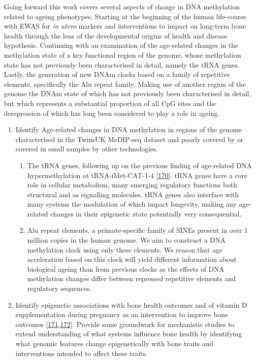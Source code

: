 \documentclass[
]{book}
\providecommand{\tightlist}{%
  \setlength{\itemsep}{0pt}\setlength{\parskip}{0pt}}
\begin{document}
Going forward this work covers several aspects of change in DNA methylation related to ageing phenotypes.
Starting at the beginning of the human life-course with EWAS for \emph{in utero} markers and interventions to impact on long-term bone health through the lens of the developmental origins of health and disease hypothesis.
Continuing with an examination of the age-related changes in the methylation state of a key functional region of the genome, whose methylation state has not previously been characterised in detail, namely the tRNA genes.
Lastly, the generation of new DNAm clocks based on a family of repetitive elements, specifically the Alu repeat family. Making use of another region of the genome the DNAm state of which has not previously been characterised in detail, but which represents a substantial proportion of all CpG sites and the derepression of which has long been considered to play a role in ageing.

\begin{enumerate}
\def\labelenumi{\arabic{enumi}.}
\item
  Identify Age-related changes in DNA methylation in regions of the genome characterised in the TwinsUK MeDIP-seq dataset and poorly covered by or covered in small samples by other technologies.

  \begin{enumerate}
  \def\labelenumii{\alph{enumii}.}
  \tightlist
  \item
    The tRNA genes, following up on the previous finding of age-related DNA hypermethylation at tRNA-iMet-CAT-1-4 {[}\protect\hyperlink{ref-Bell2016}{170}{]}. tRNA genes have a core role in cellular metabolism, many emerging regulatory functions both structural and as signalling molecules. tRNA genes also interface with many systems the modulation of which impact longevity, making any age-related changes in their epigenetic state potentially very consequential.
  \item
    Alu repeat elements, a primate-specific family of SINEs present in over 1 million copies in the human genome. We aim to construct a DNA methylation clock using only these elements. We reason that age acceleration based on this clock will yield different information about biological ageing than from previous clocks as the effects of DNA methylation changes differ between repressed repetitive elements and regulatory sequences.
  \end{enumerate}
\item
  Identify epigenetic associations with bone health outcomes and of vitamin D supplementation during pregnancy as an intervention to improve bone outcomes {[}\protect\hyperlink{ref-Harvey2012a}{171},\protect\hyperlink{ref-Cooper2016}{172}{]}. Provide some groundwork for mechanistic studies to extend understanding of what systems influence bone health by identifying what genomic features change epigenetically with bone traits and interventions intended to affect these traits.
\end{enumerate}
\end{document}
